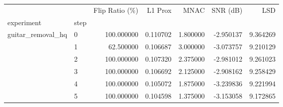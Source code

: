 \begin{tabular}{llrrrrr}
\toprule
 &  & Flip Ratio (\%) & L1 Prox & MNAC & SNR (dB) & LSD \\
experiment & step &  &  &  &  &  \\
\midrule
\multirow[t]{6}{*}{guitar\_removal\_hq} & 0 & 100.000000 & 0.110702 & 1.800000 & -2.950137 & 9.364269 \\
 & 1 & 62.500000 & 0.106687 & 3.000000 & -3.073757 & 9.210129 \\
 & 2 & 100.000000 & 0.107320 & 2.375000 & -2.981012 & 9.261023 \\
 & 3 & 100.000000 & 0.106692 & 2.125000 & -2.908162 & 9.258429 \\
 & 4 & 100.000000 & 0.105072 & 1.875000 & -3.239836 & 9.221994 \\
 & 5 & 100.000000 & 0.104598 & 1.375000 & -3.153058 & 9.172865 \\
\cline{1-7}
\bottomrule
\end{tabular}
